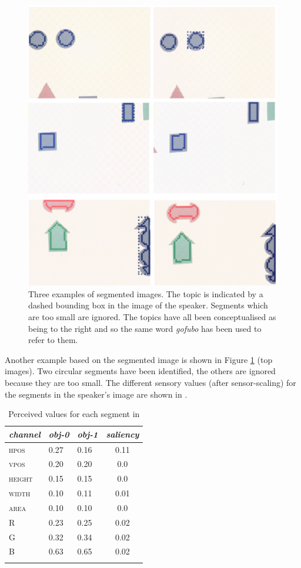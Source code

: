 \begin{figure}[hbtp]
\begin{center}
\includegraphics[width=0.8\columnwidth]{chap7/figs/plate-10.pdf}
\end{center}
\caption{Three examples of segmented images. The 
topic is indicated by a dashed bounding box in the 
image of the speaker. Segments which are too small 
are ignored. The topics have all been conceptualised
as being to the right and so the same word 
\textit{gofubo} has been used to refer to them. }
\label{f:plate-10}
\end{figure}

Another example based on the segmented image is shown in Figure 
\ref{f:plate-10} (top images). Two circular segments
have been identified, the others are ignored because they are 
too small. The different sensory values (after sensor-scaling)
for the segments in the speaker's image are shown in . 


\begin{table}[t]
\begin{center}
\begin{tabular}{  l   l   l   c  } \lsptoprule
{\itshape channel}& {\itshape obj-0} & {\itshape obj-1} & {\itshape saliency}\\ \midrule
\textsc{hpos} & 0.27 & 0.16 & 0.11\\ 
\textsc{vpos} & 0.20 & 0.20 & 0.0\\ 
\textsc{height} & 0.15 & 0.15 & 0.0\\ 
\textsc{width} & 0.10 & 0.11 & 0.01\\ 
\textsc{area} & 0.10 & 0.10 & 0.0\\ 
\textsc{R} & 0.23 & 0.25 & 0.02\\ 
\textsc{G} & 0.32 & 0.34 & 0.02\\ 
\textsc{B} & 0.63 & 0.65 & 0.02\\ 
\lspbottomrule
\end{tabular}
\caption{Perceived values for each segment in 
\label{tab:t-plate10}}
\end{center}
\end{table}

